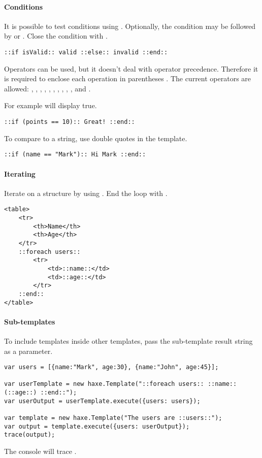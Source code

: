 \paragraph{Conditions}
It is possible to test conditions using . Optionally, the condition may be followed by  or . Close the condition with .

\begin{lstlisting} 
::if isValid:: valid ::else:: invalid ::end::
\end{lstlisting} 

Operators can be used, but it doesn't deal with operator precedence. Therefore it is required to enclose each operation in parentheses \ic{()}. The current operators are allowed: \ic{+}, \ic{-}, \ic{*}, \ic{/}, \ic{>}, \ic{<},  \ic{>=}, \ic{<=}, \ic{==}, \ic{!=}, \ic{&&} and \ic{||}.

For example  will display true. 

\begin{lstlisting} 
::if (points == 10):: Great! ::end::
\end{lstlisting} 

To compare to a string, use double quotes  in the template.
\begin{lstlisting} 
::if (name == "Mark"):: Hi Mark ::end::
\end{lstlisting} 

\paragraph{Iterating}
Iterate on a structure by using . End the loop with .
\begin{lstlisting} 
<table>
	<tr>
		<th>Name</th>
		<th>Age</th>
	</tr>
	::foreach users::
		<tr>
			<td>::name::</td>
			<td>::age::</td>
		</tr>
	::end::
</table>
\end{lstlisting} 

\paragraph{Sub-templates}
To include templates inside other templates, pass the sub-template result string as a parameter.
\begin{lstlisting} 
var users = [{name:"Mark", age:30}, {name:"John", age:45}];

var userTemplate = new haxe.Template("::foreach users:: ::name::(::age::) ::end::");
var userOutput = userTemplate.execute({users: users});

var template = new haxe.Template("The users are ::users::");
var output = template.execute({users: userOutput});
trace(output);
\end{lstlisting} 
The console will trace .

